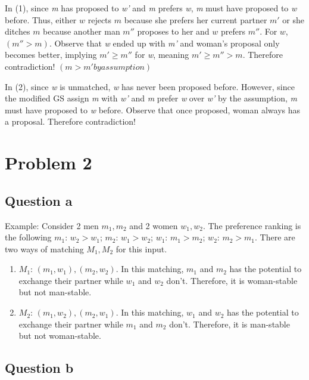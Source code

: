 \documentclass{article}
\begin{document}
    In (1), since \textit{m} has proposed to \textit{w'} and \textit{m} prefers \textit{w}, \textit{m} must have proposed to \textit{w} before. Thus, either $w$ rejects $m$ because she prefers her current partner $m'$ or she ditches $m$ because another man $m''$ proposes to her and $w$ prefers $m''$. For $w$, $(m'' > m)$. Observe that \textit{w} ended up with \textit{m'} and woman's proposal only becomes better, implying \textit{$m' \geq m''$} for \textit{w}, meaning $m' \geq m'' > m$. Therefore contradiction! $(m > m' by assumption)$
    
    In (2), since \textit{w} is unmatched, \textit{w} has never been proposed before. However, since the modified GS assign \textit{m} with \textit{w'} and \textit{m} prefer \textit{w} over \textit{w'} by the assumption, \textit{m} must have proposed to \textit{w} before. Observe that once proposed, woman always has a proposal. Therefore contradiction!

\section{Problem 2}
    \subsection{Question a}

    Example: Consider 2 men \textit{$m_1, m_2$} and 2 women \textit{$w_1, w_2$}. The preference ranking is the following \textit{$m_1$}: \textit{$w_2 > w_1$}; \textit{$m_2$}: \textit{$w_1 > w_2$}; \textit{$w_1$}: \textit{$m_1 > m_2$}; \textit{$w_2$}: \textit{$m_2 > m_1$}. There are two ways of matching \textit{$M_1, M_2$} for this input. \begin{enumerate}
        \item \textit{$M_1$}: \textit{$(m_1, w_1), (m_2, w_2)$}. In this matching, \textit{$m_1$} and \textit{$m_2$} has the potential to exchange their partner while \textit{$w_1$} and \textit{$w_2$} don't. Therefore, it is woman-stable but not man-stable.
        \item \textit{$M_2$}: \textit{$(m_1, w_2), (m_2, w_1)$}. In this matching, \textit{$w_1$} and \textit{$w_2$} has the potential to exchange their partner while \textit{$m_1$} and \textit{$m_2$} don't. Therefore, it is man-stable but not woman-stable.
    \end{enumerate}

\subsection{Question b}
\end{document}
